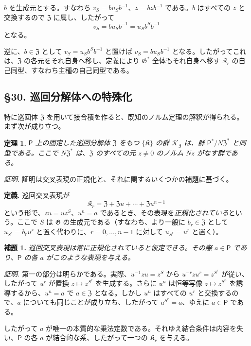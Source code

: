 \(b\) を生成元とする。すなわち \(v_S=bu_Sb^{-1}\)、\(z=bzb^{-1}\) である。\(b\) はすべての \(z\) と交換するので \(\mathfrak Z\) に属し、したがって
\[
v_S=bu_Sb^{-1}=u_Sb^Sb^{-1}
\]
となる。

逆に、\(b\in\mathfrak Z\) として \(v_S=u_Sb^Sb^{-1}\) と置けば \(v_S=bu_Sb^{-1}\) となる。したがってこれは、\(\mathfrak Z\) の各元をそれ自身へ移し、定義により \(\mathfrak G^*\) 全体もそれ自身へ移す \(\mathfrak K_r\) の自己同型、すなわち主種の自己同型である。

\subsection*{\S 30. 巡回分解体への特殊化}\label{spezialisierung-auf-zyklische-zerfaellungskoerper}

特に巡回体 \(\mathfrak Z\) を用いて接合積を作ると、既知のノルム定理の解釈が得られる。まず次が成り立つ。

\noindent\textbf{定理 1.} \emph{\(\mathsf P\) 上の固定した巡回分解体 \(\mathfrak Z\) をもつ \(\{\mathfrak K\}\) の群 \(\mathscr K_{\mathfrak Z}\) は、群 \(\mathsf P^*/N\mathfrak Z^*\) と同型である。ここで \(N\mathfrak Z^*\) は、\(\mathfrak Z\) のすべての元 \(z\ne0\) のノルム \(Nz\) がなす群である。}

\noindent\emph{証明.} 証明は交叉表現の正規化と、それに関するいくつかの補題に基づく。

\noindent\textbf{定義.} 巡回交叉表現が
\[
\mathfrak K_r=\mathfrak Z+\mathfrak Zu+\cdots+\mathfrak Zu^{n-1}
\]
という形で、\(zu=uz^S\)、\(u^n=a\) であるとき、その表現を\emph{正規化されている}という。ここで \(S\) は \(\mathfrak G\) の生成元である（すなわち、より一般に \(b_r\in\mathfrak Z\) として \(u_{S^r}=b_ru^r\) と置く代わりに、\(r=0,\ldots,n-1\) に対して \(u_{S^r}=u^r\) と置く）。

\noindent\textbf{補題 1.} \emph{巡回交叉表現は常に正規化されていると仮定できる。その際 \(a\in\mathsf P\) であり、\(\mathsf P\) の各 \(a\) がこのような表現を与える。}

\noindent\emph{証明.} 第一の部分は明らかである。実際、\(u^{-1}zu=z^S\) から \(u^{-r}zu^r=z^{S^r}\) が従い、したがって \(u^r\) が置換 \(z\mapsto z^{S^r}\) を生成する。さらに \(u^n\) は恒等写像 \(z\mapsto z^{S^n}\) を誘導するから、\(u^n=a\) で \(a\in\mathfrak Z\) となる。しかし \(u^n\) はすべての \(u^r\) と交換するので、\(a\) についても同じことが成り立ち、したがって \(a^{S^r}=a\)、ゆえに \(a\in\mathsf P\) である。

したがって \(a\) が唯一の本質的な乗法定数である。それゆえ結合条件は内容を失い、\(\mathsf P\) の各 \(a\) が結合的な系、したがって一つの \(\mathfrak K_r\) を与える。

